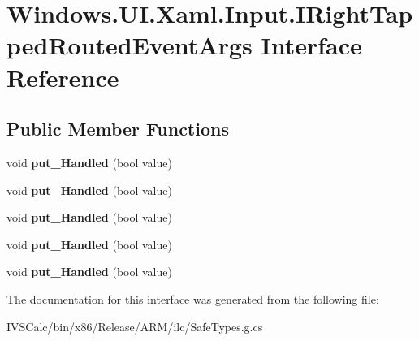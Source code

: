 \hypertarget{interface_windows_1_1_u_i_1_1_xaml_1_1_input_1_1_i_right_tapped_routed_event_args}{}\section{Windows.\+U\+I.\+Xaml.\+Input.\+I\+Right\+Tapped\+Routed\+Event\+Args Interface Reference}
\label{interface_windows_1_1_u_i_1_1_xaml_1_1_input_1_1_i_right_tapped_routed_event_args}
\subsection*{Public Member Functions}
\begin{DoxyCompactItemize}
\item 
\mbox{\label{interface_windows_1_1_u_i_1_1_xaml_1_1_input_1_1_i_right_tapped_routed_event_args_add65b8658fdf41eb5bcb8c2b89a7e6cb}} 
void {\bfseries put\+\_\+\+Handled} (bool value)
\item 
\mbox{\label{interface_windows_1_1_u_i_1_1_xaml_1_1_input_1_1_i_right_tapped_routed_event_args_add65b8658fdf41eb5bcb8c2b89a7e6cb}} 
void {\bfseries put\+\_\+\+Handled} (bool value)
\item 
\mbox{\label{interface_windows_1_1_u_i_1_1_xaml_1_1_input_1_1_i_right_tapped_routed_event_args_add65b8658fdf41eb5bcb8c2b89a7e6cb}} 
void {\bfseries put\+\_\+\+Handled} (bool value)
\item 
\mbox{\label{interface_windows_1_1_u_i_1_1_xaml_1_1_input_1_1_i_right_tapped_routed_event_args_add65b8658fdf41eb5bcb8c2b89a7e6cb}} 
void {\bfseries put\+\_\+\+Handled} (bool value)
\item 
\mbox{\label{interface_windows_1_1_u_i_1_1_xaml_1_1_input_1_1_i_right_tapped_routed_event_args_add65b8658fdf41eb5bcb8c2b89a7e6cb}} 
void {\bfseries put\+\_\+\+Handled} (bool value)
\end{DoxyCompactItemize}


The documentation for this interface was generated from the following file\+:\begin{DoxyCompactItemize}
\item 
I\+V\+S\+Calc/bin/x86/\+Release/\+A\+R\+M/ilc/Safe\+Types.\+g.\+cs\end{DoxyCompactItemize}
